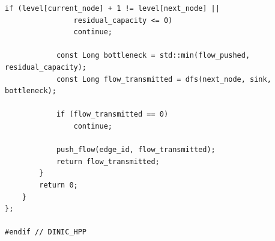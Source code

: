 \documentclass[12pt,a4paper]{article}
\begin{document}
\begin{lstlisting}[caption={Implementação em C++ da classe \lstinline{Dinic}, estruturada com Digrafo de Níveis e otimização de ponteiros mortos no cálculo do fluxo bloqueador.}, label={lst:dinic}]
			if (level[current_node] + 1 != level[next_node] ||
			    residual_capacity <= 0)
				continue;

			const Long bottleneck = std::min(flow_pushed, residual_capacity);
			const Long flow_transmitted = dfs(next_node, sink, bottleneck);

			if (flow_transmitted == 0)
				continue;

			push_flow(edge_id, flow_transmitted);
			return flow_transmitted;
		}
		return 0;
	}
};

#endif // DINIC_HPP
\end{lstlisting}

\newpage

\label{ap:push_relabel}
\end{document}
